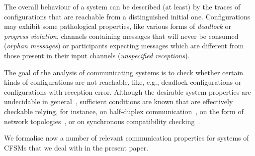 The overall behaviour of a system can be described (at least) by the traces of configurations that are reachable from a distinguished initial one. Configurations may exhibit some pathological properties, like various forms of {\em deadlock} or {\em progress violation}, channels containing messages that will never be consumed ({\em orphan messages}) or 
participants expecting messages which are different from those 
present in their input channels
({\em unspecified receptions}). 

The goal of the analysis of communicating systems is to check whether certain kinds of configurations
are not reachable, like, e.g., deadlock configurations or configurations with reception error. 
Although the desirable system properties are undecidable in general~\cite{BZ83}, sufficient conditions are known that are effectively checkable
relying, for instance, on half-duplex communication~\cite{CF05}, on the form of network topologies~\cite{DBLP:conf/concur/ClementeHS14}, or on synchronous compatibility checking~\cite{HB18}.

We formalise now a number of relevant communication properties for systems of CFSMs
that we deal with in the present paper.  

